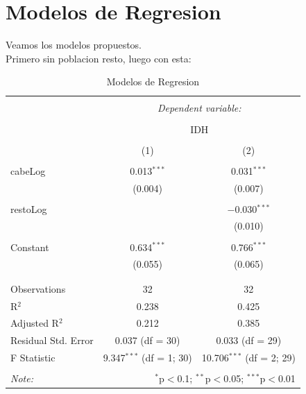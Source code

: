 \documentclass{article}
\begin{document}
\clearpage


\section{Modelos de Regresion}\label{Regresion}

Veamos los modelos propuestos. \\
Primero sin poblacion resto, luego con esta:

\begin{table}[!htbp] \centering 
  \caption{Modelos de Regresion} 
  \label{regresion} 
\begin{tabular}{@{\extracolsep{5pt}}lcc} 
\\[-1.8ex]\hline 
\hline \\[-1.8ex] 
 & \multicolumn{2}{c}{\textit{Dependent variable:}} \\ 
\cline{2-3} 
\\[-1.8ex] & \multicolumn{2}{c}{IDH} \\ 
\\[-1.8ex] & (1) & (2)\\ 
\hline \\[-1.8ex] 
 cabeLog & 0.013$^{***}$ & 0.031$^{***}$ \\ 
  & (0.004) & (0.007) \\ 
  & & \\ 
 restoLog &  & $-$0.030$^{***}$ \\ 
  &  & (0.010) \\ 
  & & \\ 
 Constant & 0.634$^{***}$ & 0.766$^{***}$ \\ 
  & (0.055) & (0.065) \\ 
  & & \\ 
\hline \\[-1.8ex] 
Observations & 32 & 32 \\ 
R$^{2}$ & 0.238 & 0.425 \\ 
Adjusted R$^{2}$ & 0.212 & 0.385 \\ 
Residual Std. Error & 0.037 (df = 30) & 0.033 (df = 29) \\ 
F Statistic & 9.347$^{***}$ (df = 1; 30) & 10.706$^{***}$ (df = 2; 29) \\ 
\hline 
\hline \\[-1.8ex] 
\textit{Note:}  & \multicolumn{2}{r}{$^{*}$p$<$0.1; $^{**}$p$<$0.05; $^{***}$p$<$0.01} \\ 
\end{tabular} 
\end{table} 
\clearpage
\end{document}
